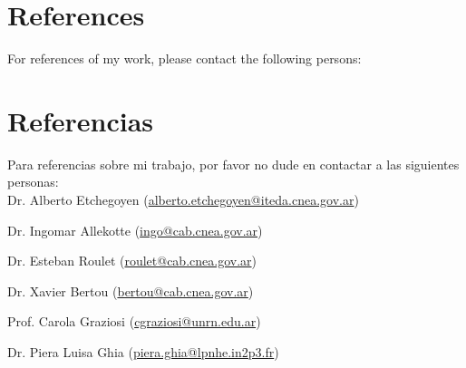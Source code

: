 \ifeng
\section*{References}

For references of my work, please contact the following persons:\\
\else
\section*{Referencias}

Para referencias sobre mi trabajo, por favor no dude en contactar a las siguientes personas:\\

\fi
Dr. Alberto Etchegoyen (\href{mailto:alberto.etchegoyen@iteda.cnea.gov.ar}{alberto.etchegoyen@iteda.cnea.gov.ar})

Dr. Ingomar Allekotte (\href{mailto:ingo@cab.cnea.gov.ar}{ingo@cab.cnea.gov.ar})

Dr. Esteban Roulet (\href{mailto:roulet@cab.cnea.gov.ar}{roulet@cab.cnea.gov.ar})

Dr. Xavier Bertou (\href{mailto:bertou@cab.cnea.gov.ar}{bertou@cab.cnea.gov.ar})

Prof. Carola Graziosi (\href{mailto:cgraziosi@unrn.edu.ar}{cgraziosi@unrn.edu.ar})

Dr. Piera Luisa Ghia (\href{mailto:piera.ghia@lpnhe.in2p3.fr}{piera.ghia@lpnhe.in2p3.fr})
